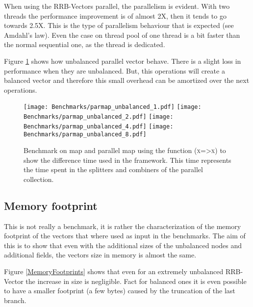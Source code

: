 When using the RRB-Vectors parallel, the parallelism is evident. With two threads the performance improvement is of almost 2X, then it tends to go towards 2.5X. This is the type of parallelism behaviour that is expected (see Amdahl's law\cite{Rodgers:1985:IMS:327010.327215}). Even the case on thread pool of one thread is a bit faster than the normal sequential one, as the thread is dedicated. 
\FloatBarrier

Figure \ref{ParallelUnbalancedBenchmarks} shows how unbalanced parallel vector behave. There is a slight loss in performance when they are unbalanced. But, this operations will create a balanced vector and therefore this small overhead can be amortized over the next operations.

\begin{figure}[h!]
  \centering
  \texttt{[image: Benchmarks/parmap\_unbalanced\_1.pdf]}
  \texttt{[image: Benchmarks/parmap\_unbalanced\_2.pdf]}
  \texttt{[image: Benchmarks/parmap\_unbalanced\_4.pdf]}
  \texttt{[image: Benchmarks/parmap\_unbalanced\_8.pdf]}
  \caption{Benchmark on map and parallel map using the function (\textsc{x=>x}) to show the difference time used in the framework. This time represents the time spent in the splitters and combiners of the parallel collection.}
  \label{ParallelUnbalancedBenchmarks}
\end{figure}

\FloatBarrier

\subsection{Memory footprint}
This is not really a benchmark, it is rather the characterization of the memory footprint of the vectors that where used as input in the benchmarks. The aim of this is to show that even with the additional sizes of the unbalanced nodes and additional fields, the vectors size in memory is almost the same. 

Figure \ref{MemoryFootprints} shows that even for an extremely unbalanced RRB-Vector the increase in size is negligible. Fact for balanced ones it is even possible to have a smaller footprint (a few bytes) caused by the truncation of the last branch. 

